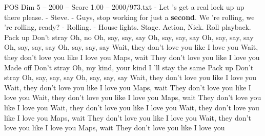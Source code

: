 \begin{textsample}{POS Dim 5 – 2000 – Score 1.00 – 2000/973.txt}  \label{ex:f5_pos_009}
- Let 's get a real lock up up there please. - Steve. - Guys, stop working for just a \textbf{second}.
We 're rolling, we 're rolling, ready? - Rolling. - House lights.
Stage.
Action, Nick.
Roll playback.
Pack up Don't stray Oh, no Oh, say, say, say Oh, say, say, say Oh, say, say, say Oh, say, say, say Oh, say, say, say Wait, they don't love you like I love you Wait, they don't love you like I love you Maps, wait They don't love you like I love you Made off Don't stray Oh, my kind, your kind I 'll stay the same Pack up Don't stray Oh, say, say, say Oh, say, say, say Wait, they don't love you like I love you Wait, they don't love you like I love you Maps, wait They don't love you like I love you Wait, they don't love you like I love you Maps, wait They don't love you like I love you Wait, they don't love you like I love you Wait, they don't love you like I love you Maps, wait They don't love you like I love you Wait, they don't love you like I love you Maps, wait They don't love you like I love you

\end{textsample}
